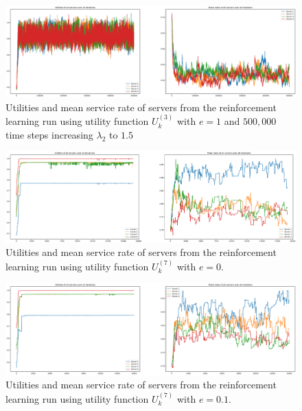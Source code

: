 \begin{figure}[H]
    \includegraphics[width=\textwidth]{chapters/00_appendix/03_more_rl_results/Bin/utility_3_eps/u3_4_lambda2_15.eps}
    \caption{Utilities and mean service rate of servers from the reinforcement
    learning run using utility function \(U_k^{(3)}\) with \(e = 1\) and
    \(500,\!000\) time steps increasing \(\lambda_2\) to \(1.5\)}
    \label{fig:RL_utility3_4_lambda2_15}
\end{figure}


\begin{figure}[H]
    \includegraphics[width=\textwidth]{chapters/00_appendix/03_more_rl_results/Bin/utility_7_eps/u7_1_e0.eps}
    \caption{Utilities and mean service rate of servers from the reinforcement
    learning run using utility function \(U_k^{(7)}\) with \(e = 0\).}
    \label{fig:RL_utility7_1_e0}
\end{figure}


\begin{figure}[H]
    \includegraphics[width=\textwidth]{chapters/00_appendix/03_more_rl_results/Bin/utility_7_eps/u7_1_e01.eps}
    \caption{Utilities and mean service rate of servers from the reinforcement
    learning run using utility function \(U_k^{(7)}\) with \(e = 0.1\).}
    \label{fig:RL_utility7_1_e01}
\end{figure}


